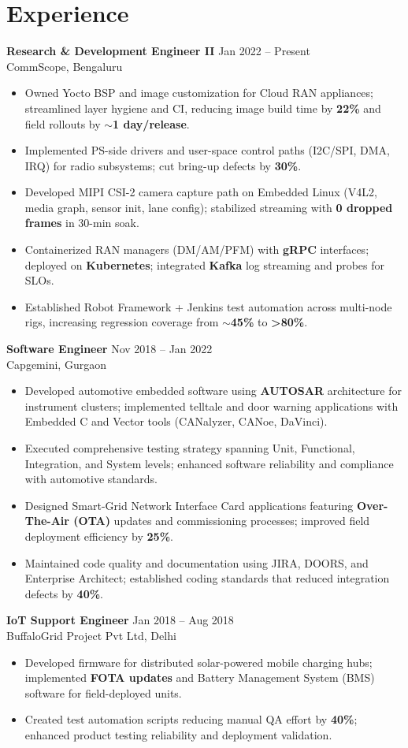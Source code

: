 \documentclass[11pt,a4paper]{article}
\newcommand{\resumeBullet}[1]{\item #1}
\begin{document}
\section*{Experience}
\textbf{Research \& Development Engineer II} \hfill Jan 2022 -- Present \\
CommScope, Bengaluru
\begin{itemize}
  \resumeBullet{Owned Yocto BSP and image customization for Cloud RAN appliances; streamlined layer hygiene and CI, reducing image build time by \textbf{22\%} and field rollouts by \textbf{$\sim$1 day/release}.}
  \resumeBullet{Implemented PS-side drivers and user-space control paths (I2C/SPI, DMA, IRQ) for radio subsystems; cut bring-up defects by \textbf{30\%}.}
  \resumeBullet{Developed MIPI CSI-2 camera capture path on Embedded Linux (V4L2, media graph, sensor init, lane config); stabilized streaming with \textbf{0 dropped frames} in 30-min soak.}
  \resumeBullet{Containerized RAN managers (DM/AM/PFM) with \textbf{gRPC} interfaces; deployed on \textbf{Kubernetes}; integrated \textbf{Kafka} log streaming and probes for SLOs.}
  \resumeBullet{Established Robot Framework + Jenkins test automation across multi-node rigs, increasing regression coverage from \textbf{$\sim$45\%} to \textbf{>80\%}.}
\end{itemize}

\textbf{Software Engineer} \hfill Nov 2018 -- Jan 2022 \\
Capgemini, Gurgaon
\begin{itemize}
  \resumeBullet{Developed automotive embedded software using \textbf{AUTOSAR} architecture for instrument clusters; implemented telltale and door warning applications with Embedded C and Vector tools (CANalyzer, CANoe, DaVinci).}
  \resumeBullet{Executed comprehensive testing strategy spanning Unit, Functional, Integration, and System levels; enhanced software reliability and compliance with automotive standards.}
  \resumeBullet{Designed Smart-Grid Network Interface Card applications featuring \textbf{Over-The-Air (OTA)} updates and commissioning processes; improved field deployment efficiency by \textbf{25\%}.}
  \resumeBullet{Maintained code quality and documentation using JIRA, DOORS, and Enterprise Architect; established coding standards that reduced integration defects by \textbf{40\%}.}
\end{itemize}

\textbf{IoT Support Engineer} \hfill Jan 2018 -- Aug 2018 \\
BuffaloGrid Project Pvt Ltd, Delhi
\begin{itemize}
  \resumeBullet{Developed firmware for distributed solar-powered mobile charging hubs; implemented \textbf{FOTA updates} and Battery Management System (BMS) software for field-deployed units.}
  \resumeBullet{Created test automation scripts reducing manual QA effort by \textbf{40\%}; enhanced product testing reliability and deployment validation.}
\end{itemize}
\end{document}
